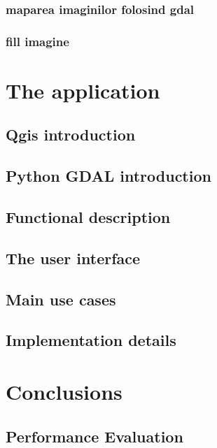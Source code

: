 \documentclass[12pt, a4paper]{report}
\begin{document}
\subsection{maparea imaginilor folosind gdal}
\subsection{fill imagine}




\chapter{The application}

\section{Qgis introduction} 


\section{Python GDAL introduction} 

\section{Functional description} 


\section{The user interface}


\section{Main use cases}


\section{Implementation details}

\newpage



\newpage{}

\chapter{Conclusions}


\section{Performance Evaluation} 
\end{document}
